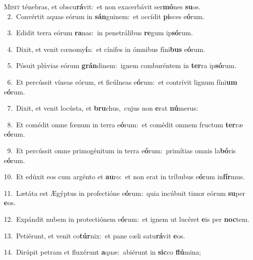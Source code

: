 \lettrine{\initial\textcolor{\initialcolor}{M}}{isit} ténebras, et obscu\-\textbf{rá}\-vit:~\star et non exacerbávit ser\-\textbf{mó}\-nes \textbf{su}\-os.\\
{\numbfont\textcolor{\numbcolor}{~2.}}~Convértit aquas eórum in \textbf{sán}\-guinem:~\star et occídit \textbf{pi}\-sces e\-\textbf{ó}\-rum.\par
{\numbfont\textcolor{\numbcolor}{~3.}}~Edidit terra eórum \textbf{ra}\-nas:~\star in penetrálibus \textbf{re}\-gum ip\-\textbf{só}\-rum.\par
{\numbfont\textcolor{\numbcolor}{~4.}}~Dixit, et venit cœnomy\-\textbf{í}\-a:~\star et cínifes in ómnibus fíni\textbf{bus} e\-\textbf{ó}\-rum.\par
{\numbfont\textcolor{\numbcolor}{~5.}}~Pósuit plúvias eórum \textbf{grán}\-dinem:~\star ignem comburéntem in \textbf{ter}\-ra ip\-\textbf{só}\-rum.\par
{\numbfont\textcolor{\numbcolor}{~6.}}~Et percússit víneas eórum, et ficúlneas e\-\textbf{ó}\-rum:~\star et contrívit lignum fíni\textbf{um} e\-\textbf{ó}\-rum.\par
{\numbfont\textcolor{\numbcolor}{~7.}}~Dixit, et venit locústa, et \textbf{bru}\-chus,~\star cujus non \textbf{e}\-rat \textbf{nú}\-merus:\par
{\numbfont\textcolor{\numbcolor}{~8.}}~Et comédit omne fœnum in terra e\-\textbf{ó}\-rum:~\star et comédit omnem fructum \textbf{ter}\-ræ e\-\textbf{ó}\-rum.\par
{\numbfont\textcolor{\numbcolor}{~9.}}~Et percússit omne primogénitum in terra e\-\textbf{ó}\-rum:~\star primítias omnis la\-\textbf{bó}\-ris e\-\textbf{ó}\-rum.\par
{\numbfont\textcolor{\numbcolor}{10.}}~Et edúxit eos cum argénto et \textbf{au}\-ro:~\star et non erat in tríbubus e\-\textbf{ó}\-rum in\-\textbf{fír}\-mus.\par
{\numbfont\textcolor{\numbcolor}{11.}}~Lætáta est Ægýptus in profectióne e\-\textbf{ó}\-rum:~\star quia incúbuit timor eórum \textbf{su}\-per \textbf{e}\-os.\par
{\numbfont\textcolor{\numbcolor}{12.}}~Expándit nubem in protectiónem e\-\textbf{ó}\-rum:~\star et ignem ut lucéret \textbf{e}\-is per \textbf{noc}\-tem.\par
{\numbfont\textcolor{\numbcolor}{13.}}~Petiérunt, et venit co\-\textbf{túr}\-nix:~\star et pane cæli satu\-\textbf{rá}\-vit \textbf{e}\-os.\par
{\numbfont\textcolor{\numbcolor}{14.}}~Dirúpit petram et fluxérunt \textbf{a}\-quæ:~\star abiérunt in \textbf{sic}\-co \textbf{flú}\-mina;\par

